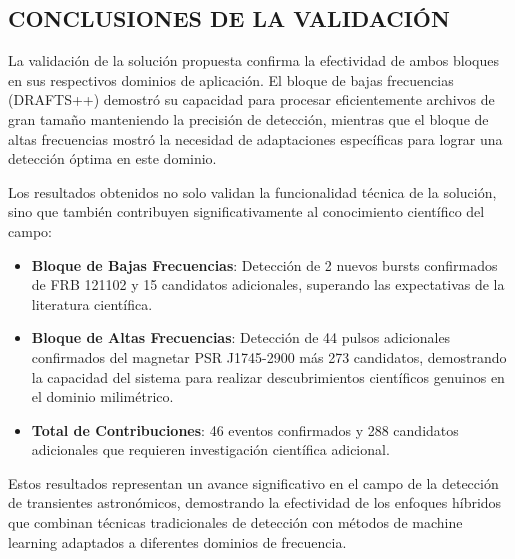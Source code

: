 \subsection{CONCLUSIONES DE LA VALIDACIÓN}

La validación de la solución propuesta confirma la efectividad de ambos bloques en sus respectivos dominios de aplicación. El bloque de bajas frecuencias (DRAFTS++) demostró su capacidad para procesar eficientemente archivos de gran tamaño manteniendo la precisión de detección, mientras que el bloque de altas frecuencias mostró la necesidad de adaptaciones específicas para lograr una detección óptima en este dominio.

Los resultados obtenidos no solo validan la funcionalidad técnica de la solución, sino que también contribuyen significativamente al conocimiento científico del campo:

\begin{itemize}
    \item \textbf{Bloque de Bajas Frecuencias}: Detección de 2 nuevos bursts confirmados de FRB 121102 y 15 candidatos adicionales, superando las expectativas de la literatura científica.
    \item \textbf{Bloque de Altas Frecuencias}: Detección de 44 pulsos adicionales confirmados del magnetar PSR J1745-2900 más 273 candidatos, demostrando la capacidad del sistema para realizar descubrimientos científicos genuinos en el dominio milimétrico.
    \item \textbf{Total de Contribuciones}: 46 eventos confirmados y 288 candidatos adicionales que requieren investigación científica adicional.
\end{itemize}

Estos resultados representan un avance significativo en el campo de la detección de transientes astronómicos, demostrando la efectividad de los enfoques híbridos que combinan técnicas tradicionales de detección con métodos de machine learning adaptados a diferentes dominios de frecuencia.
